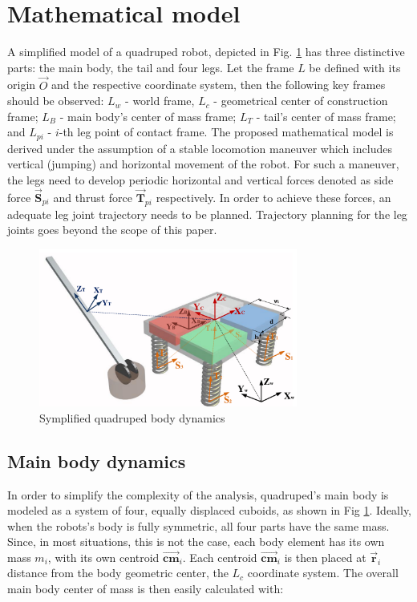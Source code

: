 \section{Mathematical model}\label{sec:MathModel}
A simplified model of a quadruped robot, depicted in Fig. \ref{fig:rmoment} has three distinctive parts: the main body, the tail and four legs. Let the frame $L$ be defined with its origin $\vec{O}$ and the respective coordinate system, then the following key frames should be observed: $L_w$ - world frame, $L_c$ - geometrical center of construction frame; $L_B$ - main body's center of mass frame; $L_T$ - tail's center of mass frame; and $L_{pi}$ - $i$-th leg point of contact frame. The proposed mathematical model is derived under the assumption of a stable locomotion maneuver which includes vertical (jumping) and horizontal movement of the robot. For such a maneuver, the legs need to develop periodic horizontal and vertical forces denoted as side force $\vec{\textbf{S}}_{pi}$ and thrust force $\vec{\textbf{T}}_{pi}$ respectively. In order to achieve these forces, an adequate leg joint trajectory needs to be planned. Trajectory planning for the leg joints goes beyond the scope of this paper. 

\begin{figure}
	\centering
	\includegraphics[width=85mm]{./pictures/RobinMoment.pdf}
	\caption{Symplified quadruped body dynamics}
	\label{fig:rmoment}
\end{figure}

\subsection{Main body dynamics}
In order to simplify the complexity of the analysis, quadruped's main body is modeled as a system of four, equally displaced cuboids, as shown in Fig \ref{fig:rmoment}. Ideally, when the robots's body is fully symmetric, all four parts have the same mass. Since, in most situations, this is not the case, each body element has its own mass $m_i$, with its own centroid $\vec{\textbf{cm}}_i$. Each centroid $\vec{\textbf{cm}}_i$ is then placed at $\vec{\textbf{r}}_i$ distance from the body geometric center, the $L_c$ coordinate system. The overall main body center of mass is then easily calculated with:
 
